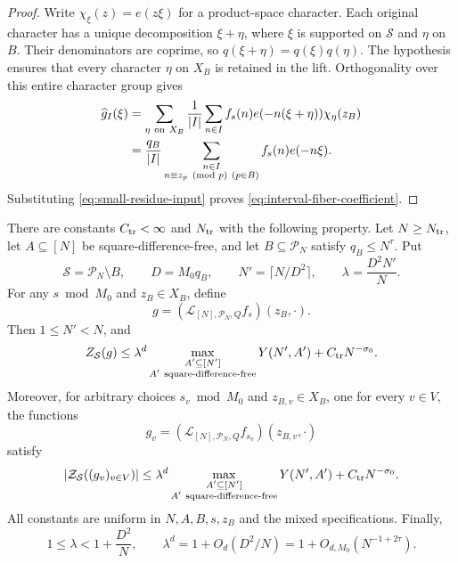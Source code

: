 \begin{proof}
Write \(\chi_\xi(z)=e(z\xi)\) for a product-space character.
Each original character has a unique decomposition \(\xi+\eta\), where
\(\xi\) is supported on \(\mathcal S\) and \(\eta\) on \(B\).  Their
denominators are coprime, so
\(q(\xi+\eta)=q(\xi)q(\eta)\).
The hypothesis ensures that every character \(\eta\) on \(X_B\) is
retained in the lift.  Orthogonality over this entire character group gives
\begin{align*}
 \widehat g_I(\xi)
 &=\sum_{\eta\ {\rm on}\ X_B}
     \frac1{|I|}\sum_{n\in I}
       f_s(n)e(-n(\xi+\eta))\chi_\eta(z_B)\\
 &=\frac{q_B}{|I|}
     \sum_{\substack{n\in I\\
                     n\equiv z_p\pmod p\ (p\in B)}}
       f_s(n)e(-n\xi).
\end{align*}
Substituting \eqref{eq:small-residue-input} proves
\eqref{eq:interval-fiber-coefficient}.
\end{proof}

\begin{proposition}
\label{prop:scale-transfer}
There are constants \(C_{\rm tr}<\infty\) and \(N_{\rm tr}\) with the
following property.  Let \(N\ge N_{\rm tr}\), let \(A\subseteq[N]\) be
square-difference-free, and let \(B\subseteq\mathcal P_N\) satisfy
\(q_B\le N^\tau\).  Put
\[
 \mathcal S=\mathcal P_N\setminus B,\qquad
 D=M_0q_B,\qquad N'=\lceil N/D^2\rceil,\qquad
 \lambda=\frac{D^2N'}N.
\]
For any \(s\bmod M_0\) and \(z_B\in X_B\), define
\[
 g=(\mathcal L_{[N],\mathcal P_N,Q}f_s)(z_B,\cdot).
\]
Then \(1\le N'<N\), and
\begin{equation}
 Z_{\mathcal S}(g)
 \le \lambda^d
       \max_{\substack{A'\subseteq[N']\\
                       A'\ {\rm square\text{-}difference\text{-}free}}}
                Y(N',A')
       +C_{\rm tr}N^{-\sigma_0}.
 \label{eq:scale-transfer-diagonal}
\end{equation}
Moreover, for arbitrary choices \(s_v\bmod M_0\) and
\(z_{B,v}\in X_B\), one for every \(v\in V\), the functions
\[
 g_v=(\mathcal L_{[N],\mathcal P_N,Q}f_{s_v})(z_{B,v},\cdot)
\]
satisfy
\begin{equation}
 |\mathcal Z_{\mathcal S}((g_v)_{v\in V})|
 \le \lambda^d
       \max_{\substack{A'\subseteq[N']\\
                       A'\ {\rm square\text{-}difference\text{-}free}}}
                Y(N',A')
       +C_{\rm tr}N^{-\sigma_0}.
 \label{eq:scale-transfer-mixed}
\end{equation}
All constants are uniform in \(N,A,B,s,z_B\) and the mixed
specifications.  Finally,
\begin{equation}
 1\le\lambda<1+\frac{D^2}{N},\qquad
 \lambda^d=1+O_d(D^2/N)
           =1+O_{d,M_0}(N^{-1+2\tau}).
 \label{eq:scale-transfer-factor}
\end{equation}
\end{proposition}

